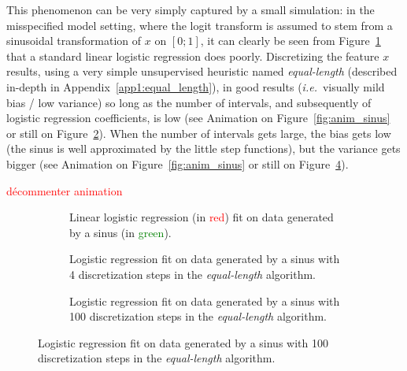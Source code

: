 This phenomenon can be very simply captured by a small simulation: in the misspecified model setting, where the logit transform is assumed to stem from a sinusoidal transformation of $x$ on $[0;1]$, it can clearly be seen from Figure~\ref{fig:sinus_lin} that a standard linear logistic regression does poorly. Discretizing the feature $x$ results, using a very simple unsupervised heuristic named \textit{equal-length} (described in-depth in Appendix~\ref{app1:equal_length}), in good results (\textit{i.e.}\ visually mild bias / low variance) so long as the number of intervals, and subsequently of logistic regression coefficients, is low (see Animation on Figure~\ref{fig:anim_sinus} or still on Figure~\ref{fig:sinus_deb}). When the number of intervals gets large, the bias gets low (the sinus is well approximated by the little step functions), but the variance gets bigger (see Animation on Figure~\ref{fig:anim_sinus} or still on Figure~\ref{fig:sinus_fin}).


\textcolor{red}{décommenter animation}


\begin{figure}[!ht]
\vspace*{-1cm}
\begin{subfigure}[t]{\textwidth}
\resizebox{\textwidth}{7cm}{}
\vspace*{-1cm}
\caption{\label{fig:sinus_lin} Linear logistic regression (in \textcolor{red}{red}) fit on data generated by a sinus (in \textcolor{green}{green}).}
\end{subfigure}
\vspace*{-1cm}
\begin{subfigure}[t]{\textwidth}
\resizebox{\textwidth}{7cm}{}
\vspace*{-1cm}
\caption{\label{fig:sinus_deb} Logistic regression fit on data generated by a sinus with 4 discretization steps in the \textit{equal-length} algorithm.}
\end{subfigure}
\vspace*{-1cm}
\begin{subfigure}[t]{\textwidth}
\resizebox{\textwidth}{7cm}{}
\caption{\label{fig:sinus_fin} Logistic regression fit on data generated by a sinus with 100 discretization steps in the \textit{equal-length} algorithm.}
\end{subfigure}
\end{figure}
 
